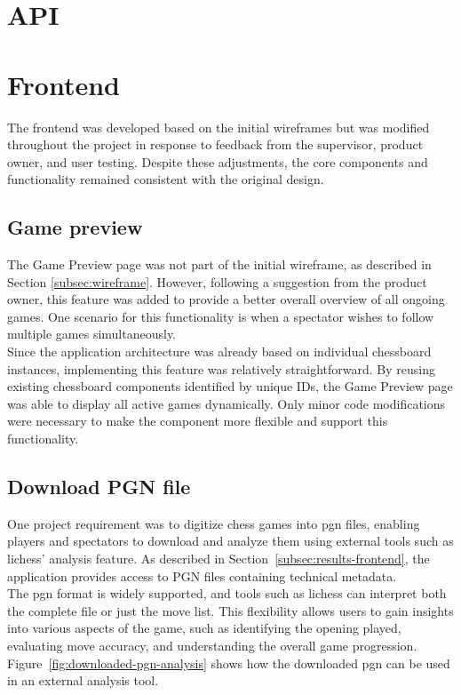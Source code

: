 \section{API}

\section{Frontend}
The frontend was developed based on the initial wireframes but was modified throughout the project in response to feedback from the supervisor, product owner, and user testing. Despite these adjustments, the core components and functionality remained consistent with the original design.

\subsection{Game preview}
The Game Preview page was not part of the initial wireframe, as described in Section \ref{subsec:wireframe}. However, following a suggestion from the product owner, this feature was added to provide a better overall overview of all ongoing games. One scenario for this functionality is when a spectator wishes to follow multiple games simultaneously. \\

Since the application architecture was already based on individual chessboard instances, implementing this feature was relatively straightforward. By reusing existing chessboard components identified by unique IDs, the Game Preview page was able to display all active games dynamically. Only minor code modifications were necessary to make the component more flexible and support this functionality.

\subsection{Download PGN file}
One project requirement was to digitize chess games into \gls{pgn} files, enabling players and spectators to download and analyze them using external tools such as \gls{lichess}’ analysis feature. As described in Section~\ref{subsec:results-frontend}, the application provides access to PGN files containing technical metadata. \\

The \gls{pgn} format is widely supported, and tools such as \gls{lichess} can interpret both the complete file or just the move list. This flexibility allows users to gain insights into various aspects of the game, such as identifying the opening played, evaluating move accuracy, and understanding the overall game progression. Figure~\ref{fig:downloaded-pgn-analysis} shows how the downloaded \gls{pgn} can be used in an external analysis tool. \\

